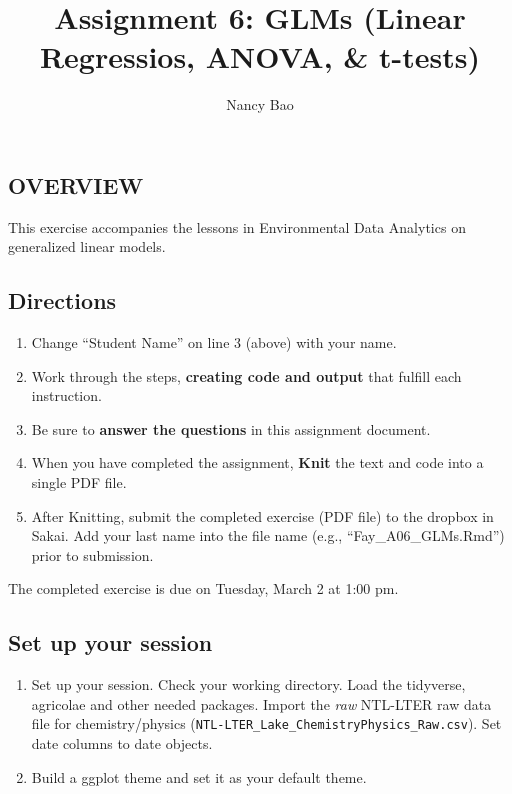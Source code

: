 \documentclass[
]{article}
\title{Assignment 6: GLMs (Linear Regressios, ANOVA, \& t-tests)}
\author{Nancy Bao}
\date{}
\providecommand{\tightlist}{%
  \setlength{\itemsep}{0pt}\setlength{\parskip}{0pt}}
\begin{document}
\maketitle

\hypertarget{overview}{%
\subsection{OVERVIEW}\label{overview}}

This exercise accompanies the lessons in Environmental Data Analytics on
generalized linear models.

\hypertarget{directions}{%
\subsection{Directions}\label{directions}}

\begin{enumerate}
\def\labelenumi{\arabic{enumi}.}
\tightlist
\item
  Change ``Student Name'' on line 3 (above) with your name.
\item
  Work through the steps, \textbf{creating code and output} that fulfill
  each instruction.
\item
  Be sure to \textbf{answer the questions} in this assignment document.
\item
  When you have completed the assignment, \textbf{Knit} the text and
  code into a single PDF file.
\item
  After Knitting, submit the completed exercise (PDF file) to the
  dropbox in Sakai. Add your last name into the file name (e.g.,
  ``Fay\_A06\_GLMs.Rmd'') prior to submission.
\end{enumerate}

The completed exercise is due on Tuesday, March 2 at 1:00 pm.

\hypertarget{set-up-your-session}{%
\subsection{Set up your session}\label{set-up-your-session}}

\begin{enumerate}
\def\labelenumi{\arabic{enumi}.}
\item
  Set up your session. Check your working directory. Load the tidyverse,
  agricolae and other needed packages. Import the \emph{raw} NTL-LTER
  raw data file for chemistry/physics
  (\texttt{NTL-LTER\_Lake\_ChemistryPhysics\_Raw.csv}). Set date columns
  to date objects.
\item
  Build a ggplot theme and set it as your default theme.
\end{enumerate}
\end{document}
